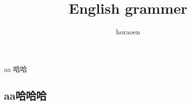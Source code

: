 \documentclass{ctexart}
\title{English grammer}
\author{horaoen}
\begin{document}
    \maketitle
    aa 哈哈
    \subsection{aa哈哈哈}
\end{document}
